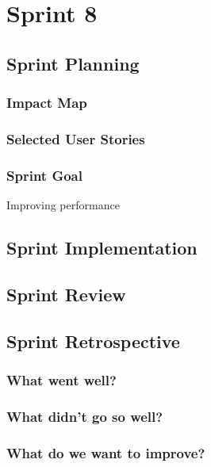 \section{Sprint 8}

\subsection{Sprint Planning}

\subsubsection{Impact Map}

\begin{figure}[h!]
	
\end{figure}

\subsubsection{Selected User Stories}

\subsubsection{Sprint Goal}

Improving performance

\subsection{Sprint Implementation}

\subsection{Sprint Review}

\subsection{Sprint Retrospective}

\subsubsection{What went well?}

\subsubsection{What didn't go so well?}

\subsubsection{What do we want to improve?}